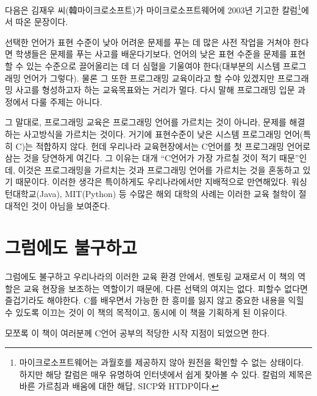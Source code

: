 \documentclass[../main.tex]{subfiles}
\begin{document}
다음은 김재우 씨(韓마이크로소프트)가 마이크로소프트웨어에 2003년 기고한
칼럼\footnote{마이크로소프트웨어는 과월호를 제공하지 않아 원전을 확인할
  수 없는 상태이다. 하지만 해당 칼럼은 매우 유명하여 인터넷에서 쉽게
  찾아볼 수 있다. 칼럼의 제목은 \textlangle{}바른 가르침과 배움에 대한
  해답, SICP와 HTDP\textrangle{}이다.}에서 따온 문장이다.

\begin{displayquote}
  선택한 언어가 표현 수준이 낮아 어려운 문제를 푸는 데 많은 사전 작업을
  거쳐야 한다면 학생들은 문제를 푸는 사고를 배운다기보다, 언어의 낮은
  표현 수준을 문제를 표현할 수 있는 수준으로 끌어올리는 데 더 심혈을
  기울여야 한다(대부분의 시스템 프로그래밍 언어가 그렇다). 물론 그 또한
  프로그래밍 교육이라고 할 수야 있겠지만 프로그래밍 사고를 형성하고자
  하는 교육목표와는 거리가 멀다. 다시 말해 프로그래밍 입문 과정에서
  다룰 주제는 아니다.
\end{displayquote}

그 말대로, 프로그래밍 교육은 프로그래밍 언어를 가르치는 것이 아니라,
문제를 해결하는 사고방식을 가르치는 것이다. 거기에 표현수준이 낮은
시스템 프로그래밍 언어(특히 C)는 적합하지 않다. 헌데 우리나라
교육현장에서는 C언어를 첫 프로그래밍 언어로 삼는 것을 당연하게
여긴다. 그 이유는 대개 ``C언어가 가장 가르칠 것이 적기 때문''인데,
이것은 프로그래밍을 가르치는 것과 프로그래밍 언어를 가르치는 것을
혼동하고 있기 때문이다. 이러한 생각은 특이하게도 우리나라에서만
지배적으로 만연해있다. 워싱턴대학교(Java), MIT(Python) 등 수많은 해외
대학의 사례는 이러한 교육 철학이 절대적인 것이 아님을 보여준다.

\section*{그럼에도 불구하고}
그럼에도 불구하고 우리나라의 이러한 교육 환경 안에서, 멘토링 교재로서
이 책의 역할은 교육 현장을 보조하는 역할이기 때문에, 다른 선택의 여지는
없다. 피할수 없다면 즐겁기라도 해야한다. C를 배우면서 가능한 한 흥미를
잃지 않고 중요한 내용을 익힐 수 있도록 이끄는 것이 이 책의 목적이고,
동시에 이 책을 기획하게 된 이유이다.

모쪼록 이 책이 여러분께 C언어 공부의 적당한 시작 지점이 되었으면 한다.
\end{document}
